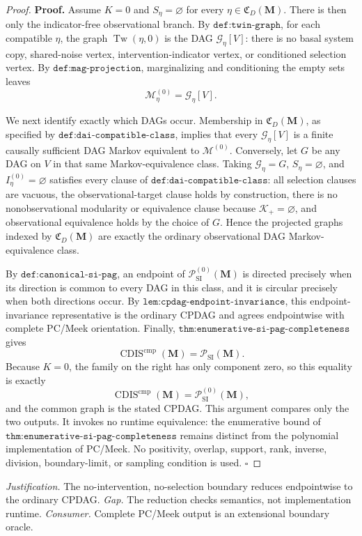 \documentclass{article}
\begin{document}
\begin{proof}
\textbf{Proof.}
Assume \(K=0\) and \(S_\eta=\varnothing\) for every \(\eta\in\mathfrak C_D(\mathbf M)\).  There is then only the indicator-free observational branch.  By \(\texttt{def:twin-graph}\), for each compatible \(\eta\), the graph \(\operatorname{Tw}(\eta,0)\) is the DAG \(\mathcal G_\eta[V]\): there is no basal system copy, shared-noise vertex, intervention-indicator vertex, or conditioned selection vertex.  By \(\texttt{def:mag-projection}\), marginalizing and conditioning the empty sets leaves
\[
\mathcal M_\eta^{(0)}=\mathcal G_\eta[V].
\]

We next identify exactly which DAGs occur.  Membership in \(\mathfrak C_D(\mathbf M)\), as specified by \(\texttt{def:dai-compatible-class}\), implies that every \(\mathcal G_\eta[V]\) is a finite causally sufficient DAG Markov equivalent to \(\mathcal M^{(0)}\).  Conversely, let \(G\) be any DAG on \(V\) in that same Markov-equivalence class.  Taking \(\mathcal G_\eta=G\), \(S_\eta=\varnothing\), and \(I_\eta^{(0)}=\varnothing\) satisfies every clause of \(\texttt{def:dai-compatible-class}\): all selection clauses are vacuous, the observational-target clause holds by construction, there is no nonobservational modularity or equivalence clause because \(\mathcal K_+=\varnothing\), and observational equivalence holds by the choice of \(G\).  Hence the projected graphs indexed by \(\mathfrak C_D(\mathbf M)\) are exactly the ordinary observational DAG Markov-equivalence class.

By \(\texttt{def:canonical-si-pag}\), an endpoint of \(\mathcal P_{\mathrm{SI}}^{(0)}(\mathbf M)\) is directed precisely when its direction is common to every DAG in this class, and it is circular precisely when both directions occur.  By \(\texttt{lem:cpdag-endpoint-invariance}\), this endpoint-invariance representative is the ordinary CPDAG and agrees endpointwise with complete PC/Meek orientation.  Finally, \(\texttt{thm:enumerative-si-pag-completeness}\) gives
\[
\operatorname{CDIS}^{\mathrm{cmp}}(\mathbf M)
=\mathcal P_{\mathrm{SI}}(\mathbf M).
\]
Because \(K=0\), the family on the right has only component zero, so this equality is exactly
\[
\operatorname{CDIS}^{\mathrm{cmp}}(\mathbf M)
=\mathcal P_{\mathrm{SI}}^{(0)}(\mathbf M),
\]
and the common graph is the stated CPDAG.  This argument compares only the two outputs.  It invokes no runtime equivalence: the enumerative bound of \(\texttt{thm:enumerative-si-pag-completeness}\) remains distinct from the polynomial implementation of PC/Meek.  No positivity, overlap, support, rank, inverse, division, boundary-limit, or sampling condition is used. \(\square\)
\end{proof}
\par\smallskip\noindent \textit{Justification.} The no-intervention, no-selection boundary reduces endpointwise to the ordinary CPDAG. \textit{Gap.} The reduction checks semantics, not implementation runtime. \textit{Consumer.} Complete PC/Meek output is an extensional boundary oracle.
\end{document}
